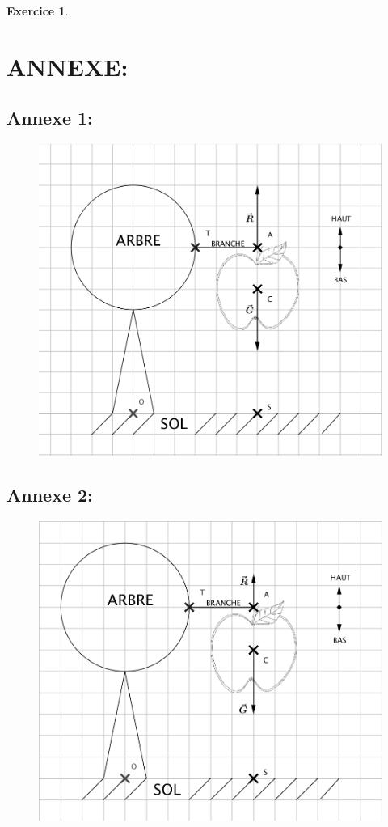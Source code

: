 \documentclass[a4paper,10.9pt]{article}
\theoremstyle{definition}
\newtheorem{exo}{Exercice}
\begin{document}
\begin{exo}
\begin{enumerate}
	
\end{enumerate}


\section*{ANNEXE:}
\subsection*{Annexe 1:}
\begin{figure}[!h]
	\centering
	\includegraphics[scale=1]{DM_2_1.png}	
\end{figure}
\subsection*{Annexe 2:}
\begin{figure}[!h]
	\centering
	\includegraphics[scale=1]{DM_2_2.png}	
\end{figure}
\end{exo}
\end{document}
